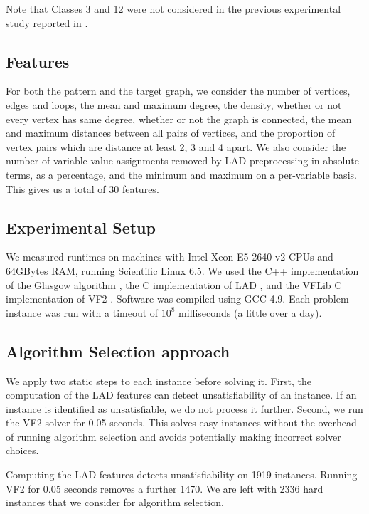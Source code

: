 \documentclass{llncs}
\begin{document}
Note that Classes 3 and 12 were not considered in the previous experimental study reported in \cite{McCreesh:2015}.

\subsection{Features}

For both the pattern and the target graph, we consider the number of vertices, edges and loops, the
mean and maximum degree, the density, whether or not every vertex has same degree, whether or not
the graph is connected, the mean and maximum distances between all pairs of vertices, and the
proportion of vertex pairs which are distance at least 2, 3 and 4 apart. We also consider the number
of variable-value assignments removed by LAD preprocessing in absolute terms, as a percentage, and
the minimum and maximum on a per-variable basis.  This gives us a total of 30 features.

\subsection{Experimental Setup}

We measured runtimes on machines with Intel Xeon E5-2640 v2 CPUs and 64GBytes RAM, running
Scientific Linux 6.5. We used the C++ implementation of the Glasgow algorithm \cite{McCreesh:2015},
the C implementation of LAD \cite{Solnon:2010}, and the VFLib C implementation of VF2
\cite{Cordella:2004}. Software was compiled using GCC 4.9. Each problem instance was run with a
timeout of $10^8$ milliseconds (a little over a day).

\subsection{Algorithm Selection approach}

We apply two static steps to each instance before solving it. First, the computation of the LAD
features can detect unsatisfiability of an instance. If an instance is identified as unsatisfiable,
we do not process it further.  Second, we run the VF2 solver for 0.05 seconds. This solves easy
instances without the overhead of running algorithm selection and avoids potentially making
incorrect solver choices.

Computing the LAD features detects unsatisfiability on 1919 instances. Running VF2 for 0.05 seconds
removes a further 1470. We are left with 2336 hard instances that we consider for algorithm
selection.
\end{document}
